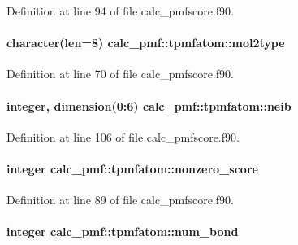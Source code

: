 Definition at line 94 of file calc\-\_\-pmfscore.\-f90.

\hypertarget{structcalc__pmf_1_1tpmfatom_a0fb9f4bbb93b060b1bbb169ccd4eab5d}{
\paragraph[{mol2type}]{\setlength{\rightskip}{0pt plus 5cm}character(len=8) calc\-\_\-pmf\-::tpmfatom\-::mol2type}}\label{structcalc__pmf_1_1tpmfatom_a0fb9f4bbb93b060b1bbb169ccd4eab5d}


Definition at line 70 of file calc\-\_\-pmfscore.\-f90.

\hypertarget{structcalc__pmf_1_1tpmfatom_a70f619b9bacfc8819d85376382dc845a}{
\paragraph[{neib}]{\setlength{\rightskip}{0pt plus 5cm}integer, dimension(0\-:6) calc\-\_\-pmf\-::tpmfatom\-::neib}}\label{structcalc__pmf_1_1tpmfatom_a70f619b9bacfc8819d85376382dc845a}


Definition at line 106 of file calc\-\_\-pmfscore.\-f90.

\hypertarget{structcalc__pmf_1_1tpmfatom_a50d3e7b86d60f104ae699c185eb788c4}{
\paragraph[{nonzero\-\_\-score}]{\setlength{\rightskip}{0pt plus 5cm}integer calc\-\_\-pmf\-::tpmfatom\-::nonzero\-\_\-score}}\label{structcalc__pmf_1_1tpmfatom_a50d3e7b86d60f104ae699c185eb788c4}


Definition at line 89 of file calc\-\_\-pmfscore.\-f90.

\hypertarget{structcalc__pmf_1_1tpmfatom_aad206cabd283117e24c0f6e172120c08}{
\paragraph[{num\-\_\-bond}]{\setlength{\rightskip}{0pt plus 5cm}integer calc\-\_\-pmf\-::tpmfatom\-::num\-\_\-bond}}\label{structcalc__pmf_1_1tpmfatom_aad206cabd283117e24c0f6e172120c08}


